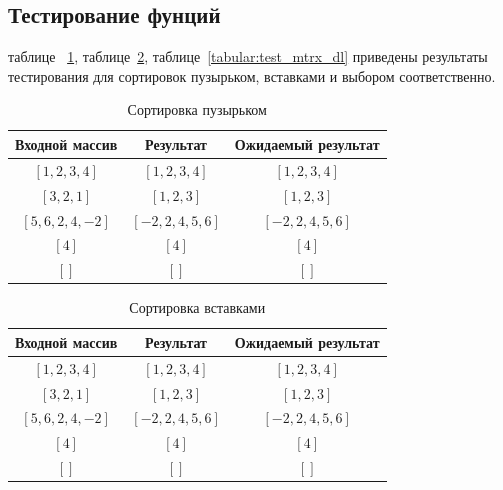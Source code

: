 \documentclass[a4paper,12pt]{article}
\begin{document}
    \begin{center}
		\subsection{Тестирование фунций}
	\end{center}
		 таблице ~\ref{tabular:test_rec}, таблице~\ref{tabular:test_mtrx_l}, таблице~\ref{tabular:test_mtrx_dl} приведены результаты тестирования для сортировок пузырьком, вставками и выбором соответственно.
        			\begin{table}[H]        		
       				\caption{\label{tabular:test_rec} Сортировка пузырьком}
       				\begin{center}       			
        			\begin{tabular}{|c|c|c|}        				
        				\hline
						Входной массив & Результат & Ожидаемый результат \\ 
						\hline
        				$[1,2,3,4]$ & $[1,2,3,4]$  & $[1,2,3,4]$\\
        				$[3,2,1]$  & $[1,2,3]$ & $[1,2,3]$\\
        				$[5,6,2,4,-2]$  & $[-2,2,4,5,6]$  & $[-2,2,4,5,6]$\\
        				$[4]$  & $[4]$  & $[4]$\\
        				$[]$  & $[]$  & $[]$\\
        				\hline
        			\end{tabular}
       				\end{center}
        			\end{table}        			
        			\vspace{1cm}
        		
        			\begin{table}[H]        		
       				\caption{\label{tabular:test_mtrx_l} Сортировка вставками}
       				\begin{center}
        			\begin{tabular}{|c|c|c|}        				
        				\hline
						Входной массив & Результат & Ожидаемый результат \\ 
						\hline
        				$[1,2,3,4]$ & $[1,2,3,4]$  & $[1,2,3,4]$\\
        				$[3,2,1]$  & $[1,2,3]$ & $[1,2,3]$\\
        				$[5,6,2,4,-2]$  & $[-2,2,4,5,6]$  & $[-2,2,4,5,6]$\\
        				$[4]$  & $[4]$  & $[4]$\\
        				$[]$  & $[]$  & $[]$\\
        				\hline
        			\end{tabular}
        			\end{center}
        			\end{table}
        			\vspace{1cm}
        		
\end{document}
